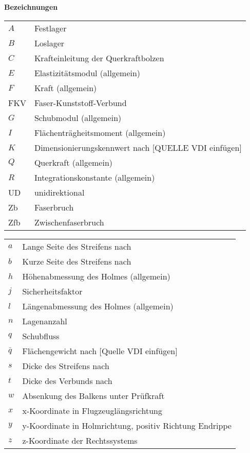 \textbf{Bezeichnungen}
\begin{table}[h]

\begin{tabular}{ll}
	$ A $&Festlager\\
	$ B $&Loslager\\
	$ C $&Krafteinleitung der Querkraftbolzen\\
	$ E $&Elastizitätsmodul (allgemein)\\
	$ F $&Kraft (allgemein)\\
	FKV&Faser-Kunststoff-Verbund\\
	$ G $&Schubmodul (allgemein)\\
	$ I $&Flächenträgheitsmoment (allgemein)\\
	$ K $&Dimensionierungskennwert nach [QUELLE VDI einfügen]\\
	$ Q $&Querkraft (allgemein)\\
	$ R $&Integrationskonstante (allgemein)\\
	UD&unidirektional\\
	Zb&Faserbruch\\
	Zfb&Zwischenfaserbruch\\
	
\end{tabular}
\end{table}

\begin{table}[h]
	\begin{tabular}{ll}
		$ a $&Lange Seite des Streifens nach \cite{item1}\\
		$ b $&Kurze Seite des Streifens nach \cite{item1}\\
		$ h $&Höhenabmessung des Holmes (allgemein)\\
		$ j $&Sicherheitsfaktor\\
		$ l $&Längenabmessung des Holmes (allgemein)\\
		$ n $&Lagenanzahl\\
		$ q $&Schubfluss\\
		$ \bar{q} $&Flächengewicht nach [Quelle VDI einfügen]\\
		$ s $&Dicke des Streifens nach \cite{item1}\\
		$ t $&Dicke des Verbunds nach \cite{item3}\\
		$ w $&Absenkung des Balkens unter Prüfkraft\\
		$ x $&x-Koordinate in Flugzeuglängsrichtung\\
		$ y $&y-Koordinate in Holmrichtung, positiv Richtung Endrippe\\
		$ z $&z-Koordinate der Rechtssystems\\
		
	\end{tabular}
\end{table}

